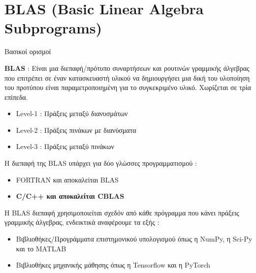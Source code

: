 \documentclass[10pt]{beamer}
\begin{document}
    \section{BLAS (Basic Linear Algebra Subprograms)}
    \begin{frame}{Βασικοί ορισμοί}
        \begin{block}{}
            \textbf{BLAS} : Είναι μια διεπαφή/πρότυπο συναρτήσεων και ρουτινών γραμμικής άλγεβρας που επιτρέπει σε έναν κατασκευαστή υλικού να δημιουργήσει μια δική του υλοποίηση του προτύπου είναι παραμετροποιημένη για το συγκεκριμένο υλικό. Χωρίζεται σε τρία επίπεδα.
            \begin{itemize}
                \item Level-1 : Πράξεις μεταξύ διανυσμάτων
                \item Level-2 : Πράξεις πινάκων με διανύσματα
                \item Level-3 : Πράξεις μεταξύ πινάκων
            \end{itemize}
        \end{block}
        \begin{block}{}
            H διεπαφή της BLAS υπάρχει για δύο γλώσσες προγραμματισμού :
            \begin{itemize}
                \item FORTRAN και αποκαλείται BLAS
                \item \textbf{C/C++ και αποκαλείται CBLAS}
            \end{itemize}
            Η BLAS διεπαφή χρησιμοποιείται σχεδόν από κάθε πρόγραμμα που κάνει πράξεις γραμμικής άλγεβρας, ενδεικτικά αναφέρουμε τα εξής :
            \begin{itemize}
                \item Βιβλιοθήκες/Προγράμματα επιστημονικού υπολογισμού όπως η NumPy, η Sci-Py και το MATLAB
                \item Βιβλιοθήκες μηχανικής μάθησης όπως η Tensorflow και η PyTorch
            \end{itemize}
        \end{block}
    \end{frame}
\end{document}
